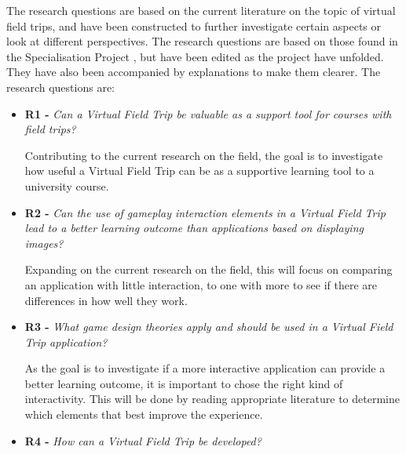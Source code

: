     The research questions are based on the current literature on the topic of virtual field trips, and have been constructed to further investigate certain aspects or look at different perspectives. The research questions are based on those found in the Specialisation Project \cite{specialisation}, but have been edited as the project have unfolded. They have also been accompanied by explanations to make them clearer. The research questions are:
    
    
    \SPACE
    
    \begin{itemize}
        \item \textbf{R1 - } \emph{Can a Virtual Field Trip be valuable as a support tool for courses with field trips?}
        
        Contributing to the current research on the field, the goal is to investigate how useful a Virtual Field Trip can be as a supportive learning tool to a university course.
        
        \SPACE
        
        \item \textbf{R2 - } \emph{Can the use of gameplay interaction elements in a Virtual Field Trip lead to a better learning outcome than applications based on displaying images?}
        
        Expanding on the current research on the field, this will focus on comparing an application with little interaction, to one with more to see if there are differences in how well they work.
        
        \SPACE
        
        \item \textbf{R3 - } \emph{What game design theories apply and should be used in a Virtual Field Trip application?}
        
        As the goal is to investigate if a more interactive application can provide a better learning outcome, it is important to chose the right kind of interactivity. This will be done by reading appropriate literature to determine which elements that best improve the experience. 
        
        \SPACE
        
        \item \textbf{R4 - } \emph{How can a Virtual Field Trip be developed?}
        

\end{itemize}

